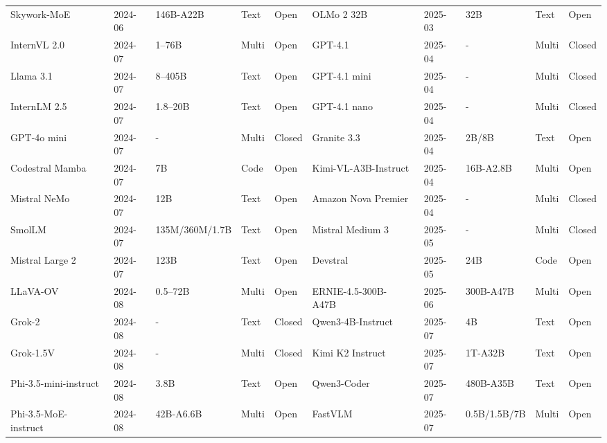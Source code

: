 \begin{table}[!p]
{\begin{tabular}{@{} lllll | lllll @{}}
Skywork-MoE~\cite{wei2024skywork} & 2024-06 & 146B-A22B & Text & Open & OLMo 2 32B~\cite{allenai2025olmo232b} & 2025-03 & 32B & Text & Open \\
InternVL 2.0~\cite{internvl2024internvl2} & 2024-07 & 1--76B & Multi & Open & GPT-4.1~\cite{openai2025gpt41} & 2025-04 & - & Multi & Closed \\
Llama 3.1~\cite{dubey2024llama3} & 2024-07 & 8--405B & Text & Open & GPT-4.1 mini~\cite{openai2025gpt41} & 2025-04 & - & Multi & Closed \\
InternLM 2.5~\cite{internlm2024internlm25} & 2024-07 & 1.8--20B & Text & Open & GPT-4.1 nano~\cite{openai2025gpt41} & 2025-04 & - & Multi & Closed \\
GPT-4o mini~\cite{openai2024gpt4omini} & 2024-07 & - & Multi & Closed & Granite 3.3~\cite{ibm2025granite33} & 2025-04 & 2B/8B & Text & Open \\
Codestral Mamba~\cite{mistral2024codestralmamba} & 2024-07 & 7B & Code & Open & Kimi-VL-A3B-Instruct~\cite{kimiteam2025kimivl} & 2025-04 & 16B-A2.8B & Multi & Open \\
Mistral NeMo~\cite{mistral2024nemo} & 2024-07 & 12B & Text & Open & Amazon Nova Premier~\cite{Intelligence2025} & 2025-04 & - & Multi & Closed \\
SmolLM~\cite{allal2024smollm} & 2024-07 & 135M/360M/1.7B & Text & Open & Mistral Medium 3~\cite{mistral2025mistralmedium3} & 2025-05 & - & Multi & Closed \\
Mistral Large 2~\cite{mistral2024mistrallarge2} & 2024-07 & 123B & Text & Open & Devstral~\cite{mistral2025devstral} & 2025-05 & 24B & Code & Open \\
LLaVA-OV~\cite{llava2024onevision} & 2024-08 & 0.5--72B & Multi & Open & ERNIE-4.5-300B-A47B~\cite{baidu2025ernie45technicalreport} & 2025-06 & 300B-A47B & Multi & Open \\
Grok-2~\cite{xai2024grok2} & 2024-08 & - & Text & Closed & Qwen3-4B-Instruct~\cite{qwen2025qwen3} & 2025-07 & 4B & Text & Open \\
Grok-1.5V~\cite{xai2024grok15v} & 2024-08 & - & Multi & Closed & Kimi K2 Instruct~\cite{kimiteam2025kimik2} & 2025-07 & 1T-A32B & Text & Open \\
Phi-3.5-mini-instruct~\cite{abdin2024phi3} & 2024-08 & 3.8B & Text & Open & Qwen3-Coder~\cite{qwen2025qwen3coder} & 2025-07 & 480B-A35B & Text & Open \\
Phi-3.5-MoE-instruct~\cite{abdin2024phi3} & 2024-08 & 42B-A6.6B & Multi & Open & FastVLM~\cite{vasu2025fastvlm} & 2025-07 & 0.5B/1.5B/7B & Multi & Open \\

\end{tabular}}
\end{table}

